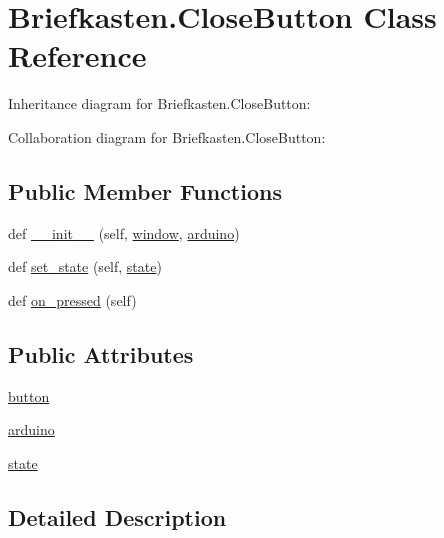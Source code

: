 \hypertarget{class_briefkasten_1_1_close_button}{}\section{Briefkasten.\+Close\+Button Class Reference}
\label{class_briefkasten_1_1_close_button}


Inheritance diagram for Briefkasten.\+Close\+Button\+:


Collaboration diagram for Briefkasten.\+Close\+Button\+:
\subsection*{Public Member Functions}
\begin{DoxyCompactItemize}
\item 
def \mbox{\hyperlink{class_briefkasten_1_1_close_button_a57c38a153335303e875213e039638312}{\+\_\+\+\_\+init\+\_\+\+\_\+}} (self, \mbox{\hyperlink{namespace_briefkasten_a23e95fd1ba50315d778c20df7e8a0d39}{window}}, \mbox{\hyperlink{class_briefkasten_1_1_close_button_a8c0cb1abf052ffff47c88fde80f2bee2}{arduino}})
\item 
def \mbox{\hyperlink{class_briefkasten_1_1_close_button_a1d80a46164c7f170140f1b68f08a368e}{set\+\_\+state}} (self, \mbox{\hyperlink{class_briefkasten_1_1_close_button_aa862c2ede33f8b03e9ff0ce97b3c78c6}{state}})
\item 
def \mbox{\hyperlink{class_briefkasten_1_1_close_button_ac776171d33d0642d14632a44517a83cb}{on\+\_\+pressed}} (self)
\end{DoxyCompactItemize}
\subsection*{Public Attributes}
\begin{DoxyCompactItemize}
\item 
\mbox{\hyperlink{class_briefkasten_1_1_close_button_aa6860fc473d698797aaddddc6b31fdb4}{button}}
\item 
\mbox{\hyperlink{class_briefkasten_1_1_close_button_a8c0cb1abf052ffff47c88fde80f2bee2}{arduino}}
\item 
\mbox{\hyperlink{class_briefkasten_1_1_close_button_aa862c2ede33f8b03e9ff0ce97b3c78c6}{state}}
\end{DoxyCompactItemize}


\subsection{Detailed Description}


